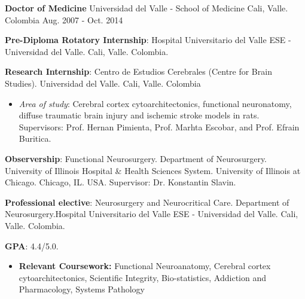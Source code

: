 \begin{cventries}
    \cventry
    {\textbf{Doctor of Medicine}} %
    {Universidad del Valle - School of Medicine} %
    {Cali, Valle. Colombia} %
    {Aug. 2007 - Oct. 2014} %
    {
      \begin{cvitems} %
        \item \textbf{Pre-Diploma Rotatory Internship}: Hospital Universitario del Valle ESE - Universidad del Valle. Cali, Valle. Colombia.
        \item \textbf{Research Internship}: Centro de Estudios Cerebrales (Centre for Brain Studies). Universidad del Valle. Cali, Valle. Colombia
        \begin{itemize}
         \item \textit{Area of study}: Cerebral cortex cytoarchitectonics, functional neuronatomy, diffuse traumatic brain injury and ischemic stroke models in rats. Supervisors: Prof. Hernan Pimienta, Prof. Marhta Escobar, and Prof. Efrain Buritica.  
        \end{itemize}
        \item \textbf{Observership}: Functional Neurosurgery.  Department of Neurosurgery.  University of Illinois Hospital \& Health Sciences System. University of Illinois at Chicago. Chicago, IL. USA. Supervisor: Dr. Konstantin Slavin.
        \item \textbf{Professional elective}: Neurosurgery and Neurocritical Care. Department of Neurosurgery.Hospital Universitario del Valle ESE - Universidad del Valle. Cali, Valle. Colombia.
        \item \textbf{GPA}: 4.4/5.0.
          \begin{itemize}
          \item \textbf{Relevant Coursework:} Functional Neuroanatomy, Cerebral cortex cytoarchitectonics, Scientific Integrity, Bio-statistics, Addiction and Pharmacology, Systems Pathology
          \end{itemize}   
      \end{cvitems}
    }

\end{cventries}
